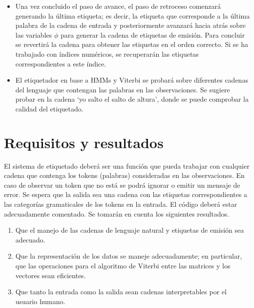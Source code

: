 \begin{itemize}
    \item Una vez concluido el paso de avance, el paso de retroceso comenzará generando la última etiqueta; es decir, la etiqueta que corresponde a la última palabra de la cadena de entrada y posteriormente avanzará hacia atrás sobre las variables $\phi$ para generar la cadena de etiquetas de emisión. Para concluir se revertirá la cadena para obtener las etiquetas en el orden correcto. Si se ha trabajado con índices numéricos, se recuperarán las etiquetas correspondientes a este índice.
    \item El etiquetador en base a HMMs y Viterbi se probará sobre diferentes cadenas del lenguaje que contengan las palabras en las observaciones. Se sugiere probar en la cadena `yo salto el salto de altura', donde se puede comprobar la calidad del etiquetado. 
\end{itemize}


\section{Requisitos y resultados}

El sistema de etiquetado deberá ser una función que pueda trabajar con cualquier cadena que contenga los tokens (palabras) consideradas en las observaciones. En caso de observar un token que no está se podrá ignorar o emitir un mensaje de error. Se espera que la salida sea una cadena con las etiquetas correspondientes a las categorías gramaticales de los tokens en la entrada. El código deberá estar adecuadamente comentado. Se tomarán en cuenta los siguientes resultados.

\begin{enumerate}
 \item Que el manejo de las cadenas de lenguaje natural y etiquetas de emisión sea adecuado.
 \item Que la representación de los datos se maneje adecuadamente; en particular, que las operaciones para el algoritmo de Viterbi entre las matrices y los vectores sean eficientes.
 \item Que tanto la entrada como la salida sean cadenas interpretables por el usuario humano.
\end{enumerate}

